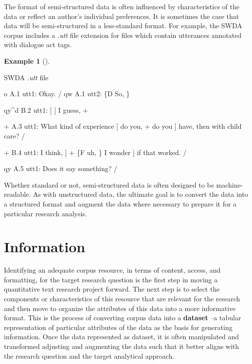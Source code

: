 \documentclass[
  letterpaper,
  DIV=11,
  numbers=noendperiod]{scrreprt}
\newenvironment{Shaded}{\begin{snugshade}}{\end{snugshade}}
\newcommand{\NormalTok}[1]{\textcolor[rgb]{0.00,0.00,0.00}{#1}}
\theoremstyle{definition}
\newtheorem{example}{Example}[chapter]
\theoremstyle{remark}
\begin{document}
The format of semi-structured data is often influenced by
characteristics of the data or reflect an author's individual
preferences. It is sometimes the case that data will be semi-structured
in a less-standard format. For example, the SWDA corpus includes a
\emph{.utt} file extension for files which contain utterances annotated
with dialogue act tags.

\begin{example}[]\protect\hypertarget{exm-swda-utt}{}\label{exm-swda-utt}

SWDA \emph{.utt} file

\begin{Shaded}
\begin{Highlighting}[]
\NormalTok{o          A.1 utt1: Okay.  /}
\NormalTok{qw          A.1 utt2: \{D So, \}}

\NormalTok{qy\^{}d          B.2 utt1: [ [ I guess, +}

\NormalTok{+          A.3 utt1: What kind of experience [ do you, + do you ] have, then with child care? /}

\NormalTok{+          B.4 utt1: I think, ] + \{F uh, \} I wonder ] if that worked. /}

\NormalTok{qy          A.5 utt1: Does it say something? /}
\end{Highlighting}
\end{Shaded}

\end{example}

Whether standard or not, semi-structured data is often designed to be
machine-readable. As with unstructured data, the ultimate goal is to
convert the data into a structured format and augment the data where
necessary to prepare it for a particular research analysis.

\section{Information}\label{information}

Identifying an adequate corpus resource, in terms of content, access,
and formatting, for the target research question is the first step in
moving a quantitative text research project forward. The next step is to
select the components or characteristics of this resource that are
relevant for the research and then move to organize the attributes of
this data into a more informative format. This is the process of
converting corpus data into a \textbf{dataset} --a
tabular representation of particular attributes of the data as the basis
for generating information. Once the data represented as dataset, it is
often manipulated and transformed adjusting and augmenting the data such
that it better aligns with the research question and the target
analytical approach.
\end{document}
